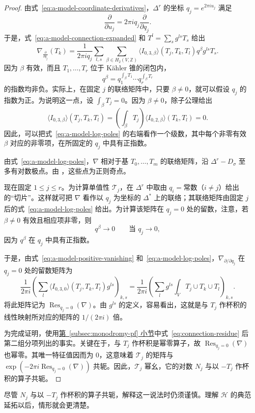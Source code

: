 \begin{proof}
由式~\eqref{eq:a-model-coordinate-derivatives}，$\Delta^r$ 的坐标 $q_j=e^{2\pi iu_j}$ 满足
\[
\frac{\partial}{\partial u_j}=2\pi iq_j\frac{\partial}{\partial q_j}.
\]
于是，式~\eqref{eq:a-model-connection-expanded} 和 $T^l=\sum_sg^{ls}T_s$ 给出
\begin{equation}\label{eq:a-model-log-poles}
\nabla_{\frac{\partial}{\partial q_j}}(T_k)
=\frac1{2\pi iq_j}\sum_{l,s}\sum_{\beta\in H_2(V,\mathbb Z)}
\langle I_{0,3,\beta}\rangle(T_j,T_k,T_l)q^\beta g^{ls}T_s.
\end{equation}
因为 $\beta$ 有效，而且 $T_1,\ldots,T_r$ 位于 Kähler 锥的闭包内，
\[
q^\beta=q_1^{\int_\beta T_1}\cdots q_r^{\int_\beta T_r}
\]
的指数均非负。实际上，在固定 $j$ 的联络矩阵中，只要 $\beta\ne0$，就可以假设 $q_j$ 的指数为正。为说明这一点，设 $\int_\beta T_j=0$。因为 $\beta\ne0$，除子公理给出
\[
\langle I_{0,3,\beta}\rangle(T_j,T_k,T_l)
=\left(\int_\beta T_j\right)\langle I_{0,2,\beta}\rangle(T_k,T_l)=0.
\]
因此，可以把式~\eqref{eq:a-model-log-poles} 的右端看作一个级数，其中每个非零有效 $\beta$ 对应的非零项，在所固定的 $q_j$ 中具有正指数。

由式~\eqref{eq:a-model-log-poles}，$\nabla$ 相对于基 $T_0,\ldots,T_m$ 的联络矩阵，沿 $\Delta^r-D_\sigma$ 至多有对数极点。由 ，这些点为正则奇点。

现在固定 $1\le j\le r$。为计算单值性 $\mathcal T_j$，在 $\Delta^r$ 中取由 $q_i=\text{常数}$（$i\ne j$）给出的“切片”。这样就可把 $\nabla$ 看作以 $q_j$ 为坐标的 $\Delta^*$ 上的联络；其联络矩阵由固定 $j$ 后的式~\eqref{eq:a-model-log-poles} 给出。为计算该矩阵在 $q_j=0$ 处的留数，注意，若 $\beta\ne0$ 有效且相应项非零，则
\begin{equation}\label{eq:a-model-positive-vanishing}
q^\beta\longrightarrow0\qquad\text{当 }q_j\longrightarrow0,
\end{equation}
因为 $q^\beta$ 在 $q_j$ 中具有正指数。

于是，由式~\eqref{eq:a-model-positive-vanishing} 和~\eqref{eq:a-model-log-poles}，$\nabla_{\partial/\partial q_j}$ 在 $q_j=0$ 处的留数矩阵为
\[
\frac1{2\pi i}\left(\sum_l\langle I_{0,3,0}\rangle(T_j,T_k,T_l)g^{ls}\right)_{k,s}
=\frac1{2\pi i}\left(\sum_lg^{ls}\int_VT_j\cup T_k\cup T_l\right)_{k,s}.
\]
将此矩阵记为 $\operatorname{Res}_{q_j=0}(\nabla)$。由 $g^{ls}$ 的定义，容易看出，这就是与 $T_j$ 作杯积的线性映射所对应的矩阵的 $1/(2\pi i)$ 倍。

为完成证明，使用\hyperref[subsec:monodromy-pf]{第~\ref*{subsec:monodromy-pf} 小节}中式~\eqref{eq:connection-residue} 后第二组分项列出的事实。关键在于，与 $T_j$ 作杯积是幂零算子，故
$\operatorname{Res}_{q_j=0}(\nabla)$ 也幂零。其唯一特征值因而为 $0$，这意味着 $\mathcal T_j$ 的矩阵与 $\exp(-2\pi i\operatorname{Res}_{q_j=0}(\nabla))$ 共轭。因此，$\mathcal T_j$ 幂幺，它的对数 $N_j$ 与以 $-T_j$ 作杯积的算子共轭。
\end{proof}
尽管 $N_j$ 与以 $-T_j$ 作杯积的算子共轭，解释这一说法时仍须谨慎。理解 $\mathcal H$ 的典范延拓以后，情形就会更清楚。

